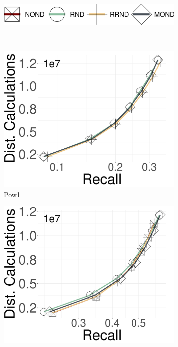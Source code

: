\begin{figure}[h!]
	\captionsetup{justification=centering}
	\centering	
		\begin{subfigure}{\columnwidth}
			\centering
			\captionsetup{justification=centering}	
			\includegraphics[width=0.4\columnwidth]{../img/Experiments/RNG/legend.png}
			\label{fig:RNG:legend}
		\end{subfigure}\\
		\begin{subfigure}{0.28\columnwidth}
			\centering
			\captionsetup{justification=centering}	
			\includegraphics[width=\textwidth]{../img/Experiments/RNG/DC_POW1.pdf}
		\caption{{Pow1}}
		\label{fig:RNG:pow1}
		\end{subfigure}	
  \hspace{0.5cm}
    		\begin{subfigure}{0.28\columnwidth}
			\centering
			\captionsetup{justification=centering}	
				\includegraphics[width=\textwidth]{../img/Experiments/RNG/DC_POW5n.pdf}

\end{subfigure}
\end{figure}
